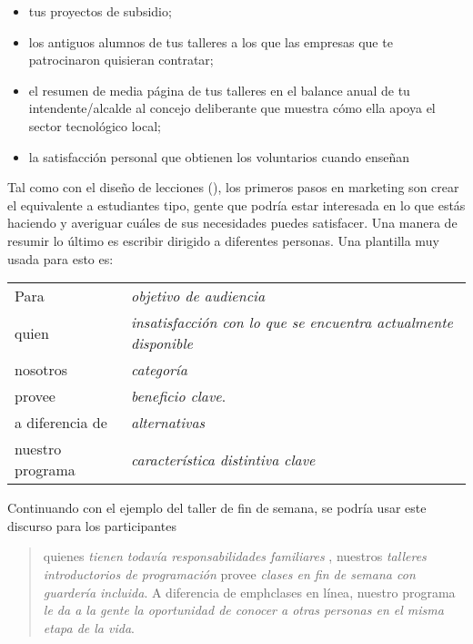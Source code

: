 \begin{itemize}

\item
   tus proyectos de subsidio;

\item
 los antiguos alumnos de tus talleres
a los que las empresas  que te patrocinaron quisieran contratar;

\item
el resumen de media página de tus talleres en el balance anual de tu intendente/alcalde al concejo deliberante
que muestra cómo ella apoya el sector tecnológico local;

\item
     la satisfacción personal que obtienen los voluntarios cuando enseñan

\end{itemize}

Tal como con el diseño de  lecciones (),
los primeros pasos en marketing son crear
el equivalente a estudiantes tipo,
gente que podría estar interesada en lo que estás haciendo 
y averiguar cuáles de sus necesidades puedes satisfacer.
Una manera de resumir lo último es escribir  
dirigido a diferentes personas.
Una plantilla muy usada para esto es:


\newpage
\begin{longtable}{ll}
  Para        & \emph{ objetivo de audiencia} \\
  quien        & \emph{ insatisfacción con lo que se encuentra actualmente disponible} \\
  nosotros        & \emph{categoría} \\
  provee    & \emph{beneficio clave}. \\
  a diferencia de    & \emph{alternativas} \\
  nuestro programa    & \emph{característica distintiva clave}

\end{longtable}

\noindent
Continuando con el ejemplo del taller de fin de semana,
se podría usar este discurso para los participantes


\begin{quote}

quienes \emph{tienen todavía responsabilidades familiares },
nuestros \emph{talleres introductorios de programación}
provee \emph{clases en fin de semana con guardería incluida}.
A diferencia de emph{clases en línea},
nuestro programa \emph{ le da a la gente la oportunidad de conocer
a otras personas en el misma etapa de la vida}.


\end{quote}

